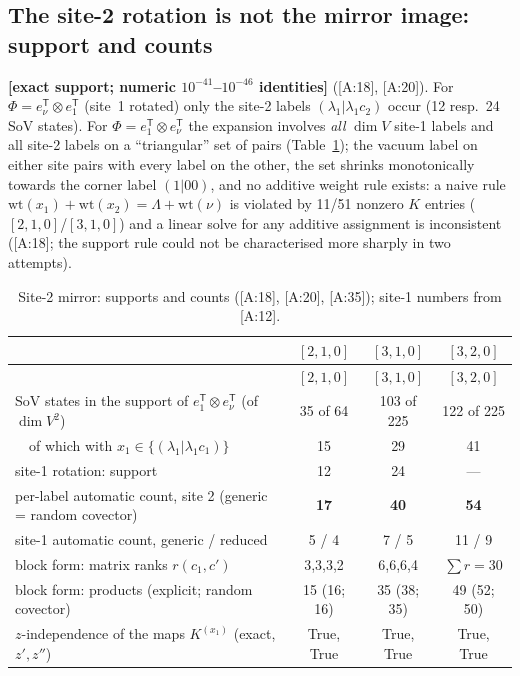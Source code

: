 \documentclass[10pt]{article}
\newcommand{\cl}[2]{\textsf{[#1:#2]}}
\newcommand{\tg}[1]{\textbf{[#1]}}
\begin{document}
\subsection{The site-2 rotation is not the mirror image: support and counts}\label{sec:Asup}

\tg{exact support; numeric $10^{-41}$--$10^{-46}$ identities} (\cl{A}{18}, \cl{A}{20}). For $\Phi=e_\nu^{\mathsf T}\otimes e_1^{\mathsf T}$ (site~1 rotated) only the site-2 labels $(\lambda_1|\lambda_1c_2)$ occur (12 resp.\ 24 SoV states). For $\Phi=e_1^{\mathsf T}\otimes e_\nu^{\mathsf T}$ the expansion involves \emph{all} $\dim V$ site-1 labels and all site-2 labels on a ``triangular'' set of pairs (Table~\ref{tab:Asup}); the vacuum label on either site pairs with every label on the other, the set shrinks monotonically towards the corner label $(1|00)$, and no additive weight rule exists: a naive rule $\mathrm{wt}(x_1)+\mathrm{wt}(x_2)=\Lambda+\mathrm{wt}(\nu)$ is violated by 11/51 nonzero $K$ entries ($[2,1,0]$/$[3,1,0]$) and a linear solve for any additive assignment is inconsistent (\cl{A}{18}; the support rule could not be characterised more sharply in two attempts).

\begin{center}\small\setlength{\tabcolsep}{4pt}\begin{longtable}{@{}p{7.2cm}ccc@{}}
\caption{Site-2 mirror: supports and counts (\cl{A}{18}, \cl{A}{20}, \cl{A}{35}); site-1 numbers from \cl{A}{12}.}\label{tab:Asup}\\\toprule
 & $[2,1,0]$ & $[3,1,0]$ & $[3,2,0]$ \\\midrule\endfirsthead
 & $[2,1,0]$ & $[3,1,0]$ & $[3,2,0]$ \\\midrule\endhead
SoV states in the support of $e_1^{\mathsf T}\otimes e_\nu^{\mathsf T}$ (of $\dim V^2$) & 35 of 64 & 103 of 225 & 122 of 225 \\
\ \ of which with $x_1\in\{(\lambda_1|\lambda_1c_1)\}$ & 15 & 29 & 41 \\
site-1 rotation: support & 12 & 24 & --- \\
per-label automatic count, site 2 (generic = random covector) & \textbf{17} & \textbf{40} & \textbf{54} \\
site-1 automatic count, generic / reduced & 5 / 4 & 7 / 5 & 11 / 9 \\
block form: matrix ranks $r(c_1,c')$ & 3,3,3,2 & 6,6,6,4 & $\sum r=30$ \\
block form: products (explicit; random covector) & 15 (16; 16) & 35 (38; 35) & 49 (52; 50) \\
$z$-independence of the maps $K^{(x_1)}$ (exact, $z',z''$) & True, True & True, True & True, True \\
\bottomrule
\end{longtable}\end{center}
\end{document}
